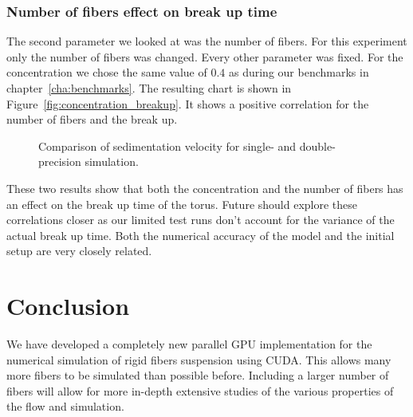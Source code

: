 \documentclass[a4paper,11pt]{kth-mag}
\begin{document}
\subsection{Number of fibers effect on break up time}

The second parameter we looked at was the number of fibers. For this experiment only the number of fibers was changed. Every other parameter was fixed. For the concentration we chose the same value of $0.4$ as during our benchmarks in chapter~\ref{cha:benchmarks}. The resulting chart is shown in Figure~\ref{fig:concentration_breakup}. It shows a positive correlation for the number of fibers and the break up.

\begin{figure}[!htbp]
  \centering
  \caption{Comparison of sedimentation velocity for single- and double-precision simulation.}
  \label{fig:number_breakup}
\end{figure}

These two results show that both the concentration and the number of fibers has an effect on the break up time of the torus. Future should explore these correlations closer as our limited test runs don't account for the variance of the actual break up time. Both the numerical accuracy of the model and the initial setup are very closely related.

\chapter{Conclusion}

We have developed a completely new parallel GPU implementation for the numerical simulation of rigid fibers suspension using CUDA. This allows many more fibers to be simulated than possible before. Including a larger number of fibers will allow for more in-depth extensive studies of the various properties of the flow and simulation.
\end{document}
